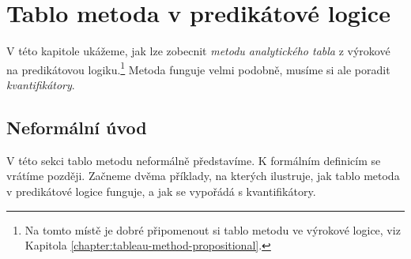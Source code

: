 \chapter{Tablo metoda v predikátové logice}

V této kapitole ukážeme, jak lze zobecnit \emph{metodu analytického tabla} z výrokové na predikátovou logiku.\footnote{Na tomto místě je dobré připomenout si tablo metodu ve výrokové logice, viz Kapitola \ref{chapter:tableau-method-propositional}.} Metoda funguje velmi podobně, musíme si ale poradit \emph{kvantifikátory}.

\section{Neformální úvod}

V této sekci tablo metodu neformálně představíme. K formálním definicím se vrátíme později. Začneme dvěma příklady, na kterých ilustruje, jak tablo metoda v predikátové logice funguje, a jak se vypořádá s kvantifikátory.

